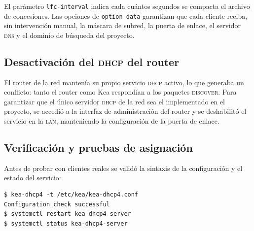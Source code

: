 El par\'ametro \texttt{lfc-interval} indica cada cu\'antos segundos se
compacta el archivo de concesiones. Las opciones de \texttt{option-data}
garantizan que cada cliente reciba, sin intervenci\'on manual, la m\'ascara
de subred, la puerta de enlace, el servidor \textsc{dns} y el dominio de
b\'usqueda del proyecto.


\subsection{Desactivaci\'on del \textsc{dhcp} del router}

El router de la red manten\'ia su propio servicio \textsc{dhcp} activo,
lo que generaba un conflicto: tanto el router como Kea respond\'ian a los
paquetes \textsc{discover}. Para garantizar que el \'unico servidor
\textsc{dhcp} de la red sea el implementado en el proyecto, se accedi\'o a
la interfaz de administraci\'on del router y se deshabilit\'o el servicio en
la \textsc{lan}, manteniendo la configuraci\'on de la puerta de enlace.


\subsection{Verificaci\'on y pruebas de asignaci\'on}

Antes de probar con clientes reales se valid\'o la sintaxis de la
configuraci\'on y el estado del servicio:

\begin{lstlisting}[style=terminal]
$ kea-dhcp4 -t /etc/kea/kea-dhcp4.conf
Configuration check successful
$ systemctl restart kea-dhcp4-server
$ systemctl status kea-dhcp4-server
\end{lstlisting}


